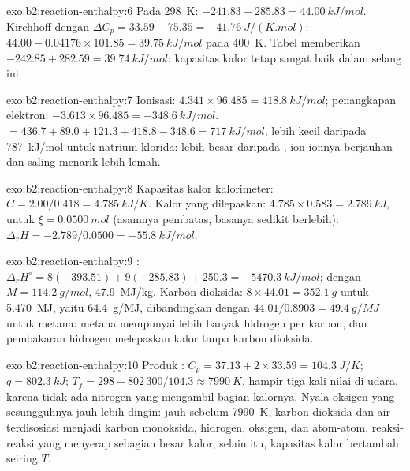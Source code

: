 \begin{solution}{exo:b2:reaction-enthalpy:6}
Pada \qty{298}{K}: $-241.83 + 285.83 = \qty{44.00}{kJ/mol}$. Kirchhoff
dengan $\Delta C_p = 33.59 - 75.35 = \qty{-41.76}{J/(K.mol)}$:
$44.00 - 0.04176 \times 101.85 = \qty{39.75}{kJ/mol}$ pada \qty{400}{K}.
Tabel memberikan $-242.85 + 282.59 = \qty{39.74}{kJ/mol}$: kapasitas kalor
tetap sangat baik dalam selang ini.
\end{solution}

\begin{solution}{exo:b2:reaction-enthalpy:7}
Ionisasi: $4.341 \times 96.485 = \qty{418.8}{kJ/mol}$; penangkapan
elektron: $-3.613 \times 96.485 = \qty{-348.6}{kJ/mol}$. 
$= 436.7 +
89.0 + 121.3 + 418.8 - 348.6 = \qty{717}{kJ/mol}$, lebih kecil
daripada \qty{787}{kJ/mol} untuk natrium klorida:  lebih besar
daripada , ion-ionnya berjauhan dan saling menarik lebih lemah.
\end{solution}

\begin{solution}{exo:b2:reaction-enthalpy:8}
Kapasitas kalor kalorimeter: $C = 2.00/0.418 = \qty{4.785}{kJ/K}$. Kalor
yang dilepaskan: $4.785 \times 0.583 = \qty{2.789}{kJ}$, untuk
$\xi =
\qty{0.0500}{mol}$ (asamnya pembatas, basanya sedikit berlebih):
$\Delta_r H = -2.789/0.0500 = \qty{-55.8}{kJ/mol}$.
\end{solution}

\begin{solution}{exo:b2:reaction-enthalpy:9}
: $\Delta_r H^\circ =
8(-393.51) + 9(-285.83) + 250.3 = \qty{-5470.3}{kJ/mol}$; dengan
$M =
\qty{114.2}{g/mol}$, \qty{47.9}{MJ/kg}. Karbon dioksida:
$8 \times 44.01 =
\qty{352.1}{g}$ untuk \qty{5.470}{MJ}, yaitu
\qty{64.4}{g/MJ}, dibandingkan dengan $44.01/0.8903 = \qty{49.4}{g/MJ}$
untuk metana: metana mempunyai lebih banyak hidrogen per karbon, dan
pembakaran hidrogen melepaskan kalor tanpa karbon dioksida.
\end{solution}

\begin{solution}{exo:b2:reaction-enthalpy:10}
Produk : $C_p = 37.13 + 2 \times 33.59 =
\qty{104.3}{J/K}$; $q = \qty{802.3}{kJ}$; $T_f = 298 + 802\,300/104.3 \approx
\qty{7990}{K}$, hampir tiga kali nilai di udara, karena tidak ada nitrogen
yang mengambil bagian kalornya. Nyala oksigen yang sesungguhnya jauh
lebih dingin: jauh sebelum \qty{7990}{K}, karbon dioksida dan air
terdisosiasi menjadi karbon monoksida, hidrogen, oksigen, dan atom-atom,
reaksi-reaksi  yang menyerap sebagian besar kalor; selain itu,
kapasitas kalor bertambah seiring $T$.
\end{solution}

